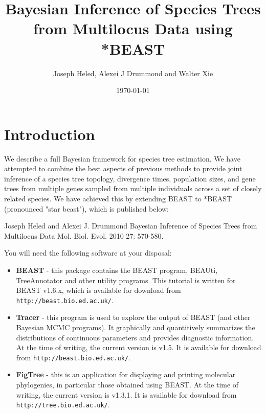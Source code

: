 \documentclass[12pt]{article}
\begin{document}
\title{Bayesian Inference of Species Trees from Multilocus Data using *BEAST }

\author{Joseph Heled, Alexei J Drummond and Walter Xie}

\date{\today{}}

\maketitle

\section*{Introduction}

We describe a full Bayesian framework for species tree estimation. We have attempted to combine the best aspects of previous methods to provide joint inference of a species tree topology, divergence times, population sizes, and gene trees from multiple genes sampled from multiple individuals across a set of closely related species. We have achieved this by extending BEAST to *BEAST (pronounced "star beast"), which is published below:

Joseph Heled and Alexei J. Drummond
Bayesian Inference of Species Trees from Multilocus Data
Mol. Biol. Evol. 2010 27: 570-580. 

You will need the following software at your disposal:

\begin{itemize}

\item {\bf BEAST} - this package contains the BEAST program, BEAUti, TreeAnnotator and other utility programs. This tutorial is written for BEAST v1.6.x, which is available for download from  \texttt{http://beast.bio.ed.ac.uk/}.
\item {\bf Tracer} - this program is used to explore the output of BEAST (and other Bayesian MCMC programs). It graphically and
quantitively summarizes the distributions of continuous parameters and provides diagnostic information. At the time of
writing, the current version is v1.5. It is available for download from \texttt{http://beast.bio.ed.ac.uk/}.
\item {\bf FigTree} - this is an application for displaying and printing molecular phylogenies, in particular those obtained using
BEAST. At the time of writing, the current version is v1.3.1. It is available for download from \texttt{http://tree.bio.ed.ac.uk/}.
\end{itemize}
\end{document}
